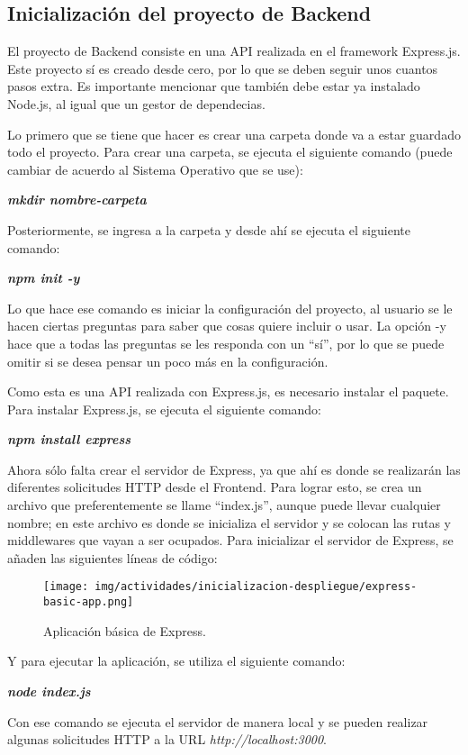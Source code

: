 \subsection{Inicialización del proyecto de Backend}
El proyecto de Backend consiste en una API realizada en el framework Express.js. Este proyecto sí es creado desde cero, por lo que se deben seguir unos cuantos pasos extra. Es importante mencionar que también debe estar ya instalado Node.js, al igual que un gestor de dependecias.

Lo primero que se tiene que hacer es crear una carpeta donde va a estar guardado todo el proyecto. Para crear una carpeta, se ejecuta el siguiente comando (puede cambiar de acuerdo al Sistema Operativo que se use):
    \begin{center}
        \textbf{
            \emph{
                mkdir nombre-carpeta
                }
            }
    \end{center}
Posteriormente, se ingresa a la carpeta y desde ahí se ejecuta el siguiente comando:
    \begin{center}
        \textbf{
            \emph{
                npm init -y
                }
            }
    \end{center}
Lo que hace ese comando es iniciar la configuración del proyecto, al usuario se le hacen ciertas preguntas para saber que cosas quiere incluir o usar. La opción -y hace que a todas las preguntas se les responda con un ``sí'', por lo que se puede omitir si se desea pensar un poco más en la configuración.

Como esta es una API realizada con Express.js, es necesario instalar el paquete. Para instalar Express.js, se ejecuta el siguiente comando:
    \begin{center}
        \textbf{
            \emph{
                npm install express
                }
            }
    \end{center}
Ahora sólo falta crear el servidor de Express, ya que ahí es donde se realizarán las diferentes solicitudes HTTP desde el Frontend. Para lograr esto, se crea un archivo que preferentemente se llame ``index.js'', aunque puede llevar cualquier nombre; en este archivo es donde se inicializa el servidor y se colocan las rutas y middlewares que vayan a ser ocupados. Para inicializar el servidor de Express, se añaden las siguientes líneas de código:

    \begin{figure}[H]
        \begin{center}
            \texttt{[image: img/actividades/inicializacion-despliegue/express-basic-app.png]}
            \caption{Aplicación básica de Express.}
            \label{fig:express-basic-app}
        \end{center}
    \end{figure}
Y para ejecutar la aplicación, se utiliza el siguiente comando:
    \begin{center}
        \textbf{
            \emph{
                node index.js
                }
            }
    \end{center}
Con ese comando se ejecuta el servidor de manera local y se pueden realizar algunas solicitudes HTTP a la URL \emph{http://localhost:3000}.
